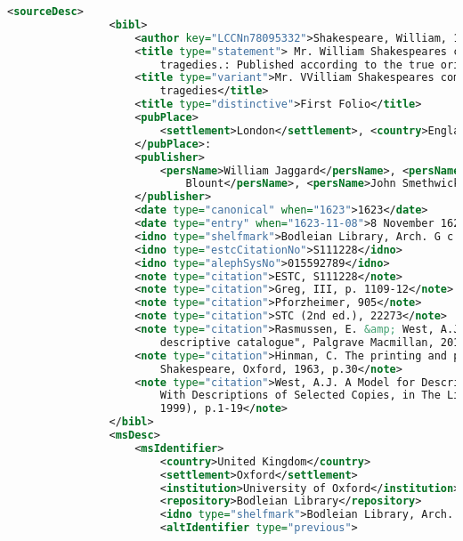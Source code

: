 \documentclass[class=article, crop=false]{standalone}
\begin{document}
\begin{lstlisting}[language=XML]
            <sourceDesc>
                <bibl>
                    <author key="LCCNn78095332">Shakespeare, William, 1564-1616.</author>
                    <title type="statement"> Mr. William Shakespeares comedies, histories, &amp;
                        tragedies.: Published according to the true originall copies.</title>
                    <title type="variant">Mr. VVilliam Shakespeares comedies, histories, &amp;
                        tragedies</title>
                    <title type="distinctive">First Folio</title>
                    <pubPlace>
                        <settlement>London</settlement>, <country>England</country>
                    </pubPlace>:
                    <publisher>
                        <persName>William Jaggard</persName>, <persName>Edward
                            Blount</persName>, <persName>John Smethwicke</persName>
                    </publisher>
                    <date type="canonical" when="1623">1623</date>
                    <date type="entry" when="1623-11-08">8 November 1623 (entered)</date>
                    <idno type="shelfmark">Bodleian Library, Arch. G c.7</idno>
                    <idno type="estcCitationNo">S111228</idno>
                    <idno type="alephSysNo">015592789</idno>
                    <note type="citation">ESTC, S111228</note>
                    <note type="citation">Greg, III, p. 1109-12</note>
                    <note type="citation">Pforzheimer, 905</note>
                    <note type="citation">STC (2nd ed.), 22273</note>
                    <note type="citation">Rasmussen, E. &amp; West, A.J. "The Shakespeare First Folios a
                        descriptive catalogue", Palgrave Macmillan, 2012.</note>
                    <note type="citation">Hinman, C. The printing and proof-reading of the First Folio of
                        Shakespeare, Oxford, 1963, p.30</note>
                    <note type="citation">West, A.J. A Model for Describing Shakespeare First Folios,
                        With Descriptions of Selected Copies, in The Library, v. s6-21, Issue 1 (March
                        1999), p.1-19</note>
                </bibl>
                <msDesc>
                    <msIdentifier>
                        <country>United Kingdom</country>
                        <settlement>Oxford</settlement>
                        <institution>University of Oxford</institution>
                        <repository>Bodleian Library</repository>
                        <idno type="shelfmark">Bodleian Library, Arch. G c.7</idno>
                        <altIdentifier type="previous">

\end{lstlisting}
\end{document}
